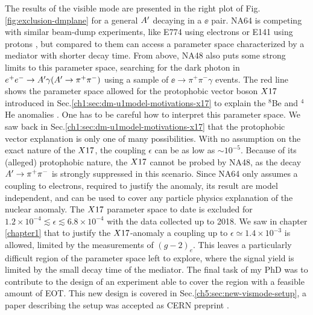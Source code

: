 The results of the visible mode are presented in the right plot of Fig.\ref{fig:exclusion-dmplane} for a general $A'$ decaying in a $\ee$ pair. NA64 is competing with similar beam-dump experiments, like E774 using electrons \cite{PhysRevLett.67.2942} or E141 using protons \cite{PhysRevLett.59.755}, but compared to them can access a parameter space characterized by a mediator with shorter decay time. From above, NA48 also puts some strong limits to this parameter space, searching for the dark photon in $e^+e^- \to A' \gamma (A' \to \pi^+ \pi^-)$ using a sample of $\ee \to \pi^+ \pi^- \gamma$ events. The red line shows the parameter space allowed for the protophobic vector boson $X17$ introduced in Sec.\ref{ch1:sec:dm-u1model-motivations-x17} to explain the $^8$Be and $^4$He anomalies \cite{Krasznahorkay:2015iga,Krasznahorkay:2019lyl}.
One has to be careful how to interpret this parameter space. We saw back in Sec.\ref{ch1:sec:dm-u1model-motivations-x17} that the protophobic vector explanation is only one of many possibilities. With no assumption on the exact nature of the $X17$, the coupling $\epsilon$ can be as low as $\sim 10^{-5}$. Because of its (alleged) protophobic nature, the $X17$ cannot be probed by NA48, as the decay $A' \to \pi^+ \pi^-$ is strongly suppressed in this scenario. Since NA64 only assumes a coupling to electrons, required to justify the anomaly, its result are model independent, and can be used to cover any particle physics explanation of the nuclear anomaly. The $X17$ parameter space to date is excluded for $1.2 \times 10^{-4} \lesssim \epsilon \lesssim 6.8 \times 10^{-4}$ with the data collected up to 2018. We saw in chapter \ref{chapter1} that to justify the $X17$-anomaly a coupling up to $\epsilon \simeq 1.4 \times 10^{-3}$ is allowed, limited by the measurements of $(g-2)_e$. This leaves a particularly difficult region of the parameter space left to explore, where the signal yield is limited by the small decay time of the mediator. The final task of my PhD was to contribute to the design of an experiment able to cover the region with a feasible amount of EOT. This new design is covered in Sec.\ref{ch5:sec:new-vismode-setup}, a paper describing the setup was accepted as CERN preprint \cite{Depero:2020zfy}.

